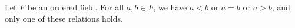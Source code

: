 Let $F$ be an ordered field. For all $a, b \in F$, we have $a < b$ or $a = b$ or $a > b$, and only one of these relations holds.